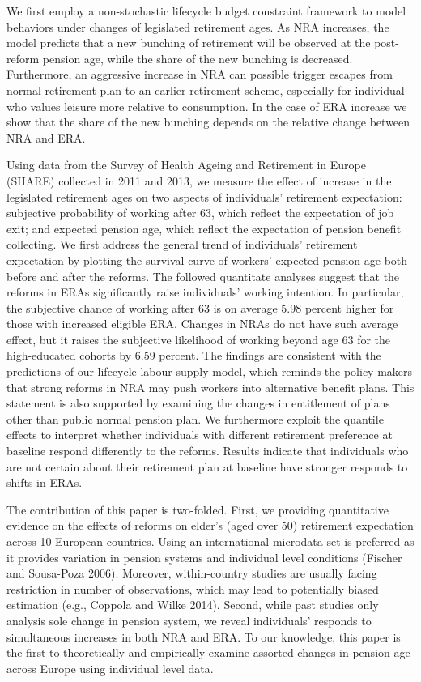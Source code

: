 \documentclass[a4paper]{article}
\begin{document}
We first employ a non-stochastic lifecycle budget constraint framework to model behaviors under changes of legislated retirement ages. As NRA increases, the model predicts that a new bunching of retirement will be observed at the post-reform pension age, while the share of the new bunching is decreased. Furthermore, an aggressive increase in NRA can possible trigger escapes from normal retirement plan to an earlier retirement scheme, especially for individual who values leisure more relative to consumption. In the case of ERA increase we show that the share of the new bunching depends on the relative change between NRA and ERA. 

Using data from the Survey of Health Ageing and Retirement in Europe (SHARE) collected in 2011 and 2013, we measure the effect of increase in the legislated retirement ages on two aspects of individuals’ retirement expectation: subjective probability of working after 63, which reflect the expectation of job exit; and expected pension age, which reflect the expectation of pension benefit collecting. We first address the general trend of individuals’ retirement expectation by plotting the survival curve of workers’ expected pension age both before and after the reforms. The followed quantitate analyses suggest that the reforms in ERAs significantly raise individuals’ working intention. In particular, the subjective chance of working after 63 is on average 5.98 percent higher for those with increased eligible ERA. Changes in NRAs do not have such average effect, but it raises the subjective likelihood of working beyond age 63 for the high-educated cohorts by 6.59 percent. The findings are consistent with the predictions of our lifecycle labour supply model, which reminds the policy makers that strong reforms in NRA may push workers into alternative benefit plans. This statement is also supported by examining the changes in entitlement of plans other than public normal pension plan. We furthermore exploit the quantile effects to interpret whether individuals with different retirement preference at baseline respond differently to the reforms. Results indicate that individuals who are not certain about their retirement plan at baseline have stronger responds to shifts in ERAs.

The contribution of this paper is two-folded. First, we providing quantitative evidence on the effects of reforms on elder’s (aged over 50) retirement expectation across 10 European countries. Using an international microdata set is preferred as it provides variation in pension systems and individual level conditions (Fischer and Sousa-Poza 2006). Moreover, within-country studies are usually facing restriction in number of observations, which may lead to potentially biased estimation (e.g., Coppola and Wilke 2014). Second, while past studies only analysis sole change in pension system, we reveal individuals’ responds to simultaneous increases in both NRA and ERA. To our knowledge, this paper is the first to theoretically and empirically examine assorted changes in pension age across Europe using individual level data.
\end{document}

